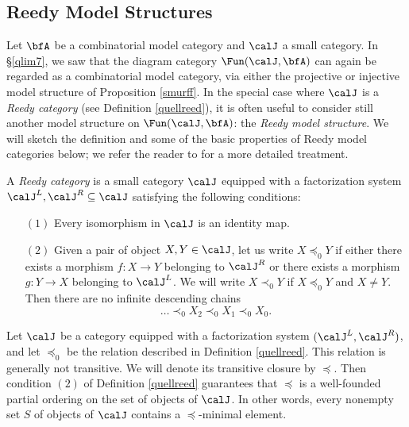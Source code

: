 \subsection{Reedy Model Structures}\label{coreed}

Let $\bfA$ be a combinatorial model category and $\calJ$ a small category. In
\S \ref{qlim7}, we saw that the diagram category $\Fun( \calJ, \bfA)$ can again be regarded as a combinatorial model category, via either the projective or injective model structure of
Proposition \ref{smurff}. In the special case where $\calJ$ is a {\em Reedy category}
(see Definition \ref{quellreed}), it is often useful to consider still another model structure on $\Fun(\calJ, \bfA)$: the {\it Reedy model structure}. We will sketch the definition and some of the basic properties of Reedy model categories below; we refer the reader to \cite{hirschhorn} for a more detailed treatment.

\begin{definition}\label{quellreed}
A {\it Reedy category} is a small category $\calJ$ equipped with a factorization
system $\calJ^{L}, \calJ^{R} \subseteq \calJ$ satisfying the following conditions:
\begin{itemize}
\item[$(1)$] Every isomorphism in $\calJ$ is an identity map.
\item[$(2)$] Given a pair of object $X, Y \in \calJ$, let us write
$X \preceq_0 Y$ if either there exists a morphism $f: X \rightarrow Y$ belonging
to $\calJ^{R}$ or there exists a morphism $g: Y \rightarrow X$ belonging to $\calJ^{L}$.
We will write $X \prec_0 Y$ if $X \preceq_0 Y$ and $X \neq Y$.
Then there are no infinite descending chains $$ \ldots \prec_0 X_2 \prec_0 X_1 \prec_0 X_0.$$
\end{itemize}
\end{definition}

\begin{remark}
Let $\calJ$ be a category equipped with a factorization system $(\calJ^{L}, \calJ^{R})$, and let
$\preceq_0$ be the relation described in Definition \ref{quellreed}. This relation is generally not transitive. We will denote its transitive closure by $\preceq$. Then condition
$(2)$ of Definition \ref{quellreed} guarantees that $\preceq$ is a well-founded partial ordering on the set of objects of $\calJ$. In other words, every nonempty set $S$ of objects
of $\calJ$ contains a $\preceq$-minimal element.
\end{remark}

